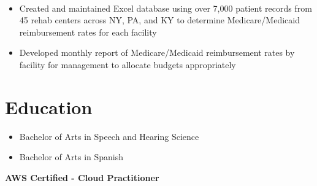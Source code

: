 \documentclass[letterpaper]{twentysecondcv} %
\begin{document}
\begin{flushleft}
\noindent{}\textbox{\hfil  \hfil}
\\
{}
\vspace{-2mm}
\begin{itemize}
    \setlength\itemsep{-0.5em}
    \item Created and maintained Excel database using over 7,000 patient records from 45 rehab centers across NY, PA, and KY to determine Medicare/Medicaid reimbursement rates for each facility 
    \item Developed monthly report of Medicare/Medicaid reimbursement rates by facility for management to allocate budgets appropriately
\end{itemize}
\end{flushleft}

\section{Education}
\noindent{}\textbox{\hfil  \hfil}
\vspace{-2mm}
\begin{itemize}
    \setlength\itemsep{-0.5em}
    \item Bachelor of Arts in Speech and Hearing Science
    \item Bachelor of Arts in Spanish
\end{itemize}

\textbf{AWS Certified - Cloud Practitioner}
\end{document}
